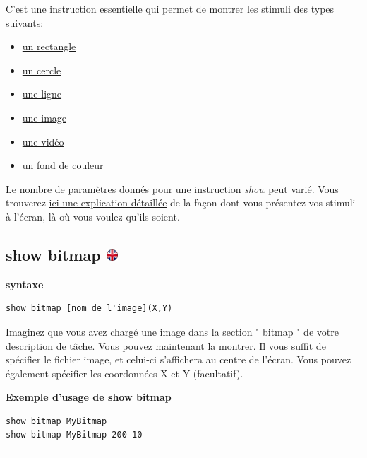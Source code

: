 \documentclass[
]{book}
\providecommand{\tightlist}{%
  \setlength{\itemsep}{0pt}\setlength{\parskip}{0pt}}
\begin{document}
C'est une instruction essentielle qui permet de montrer les stimuli des
types suivants:

\begin{itemize}
\tightlist
\item
  \protect\hyperlink{task-show-rectangle}{un rectangle}
\item
  \protect\hyperlink{task-show-circle}{un cercle}
\item
  \protect\hyperlink{task-show-text}{une ligne}
\item
  \protect\hyperlink{task-show-bitmap}{une image}
\item
  \protect\hyperlink{task-show-video}{une vidéo}
\item
  \protect\hyperlink{task-show-background}{un fond de couleur}
\end{itemize}

Le nombre de paramètres donnés pour une instruction \emph{show} peut
varié. Vous trouverez \protect\hyperlink{s4-2}{ici une explication
détaillée} de la façon dont vous présentez vos stimuli à l'écran, là où
vous voulez qu'ils soient.

\hypertarget{show-bitmap}{%
\subsection[show bitmap ]{\texorpdfstring{show bitmap
\href{https://www.psytoolkit.org/doc3.2.0/syntax.html\#task-show-bitmap}{\protect\includegraphics{img/ukflag.png}}}{show bitmap }}\label{show-bitmap}}

\textbf{syntaxe}

\begin{verbatim}
show bitmap [nom de l'image](X,Y)
\end{verbatim}

Imaginez que vous avez chargé une image dans la section " bitmap " de
votre description de tâche. Vous pouvez maintenant la montrer. Il vous
suffit de spécifier le fichier image, et celui-ci s'affichera au centre
de l'écran. Vous pouvez également spécifier les coordonnées X et Y
(facultatif).

\textbf{Exemple d'usage de show bitmap}

\begin{verbatim}
show bitmap MyBitmap
show bitmap MyBitmap 200 10
\end{verbatim}

\begin{center}\rule{0.5\linewidth}{\linethickness}\end{center}
\end{document}
